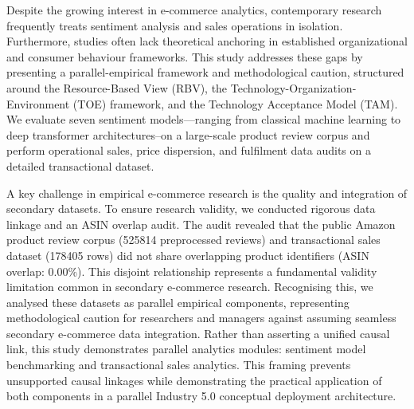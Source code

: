\documentclass[authoryear,review,3p,times,12pt]{elsarticle}
\begin{document}
Despite the growing interest in e-commerce analytics, contemporary research frequently treats sentiment analysis and sales operations in isolation. Furthermore, studies often lack theoretical anchoring in established organizational and consumer behaviour frameworks. This study addresses these gaps by presenting a parallel-empirical framework and methodological caution, structured around the Resource-Based View (RBV), the Technology-Organization-Environment (TOE) framework, and the Technology Acceptance Model (TAM). We evaluate seven sentiment models—ranging from classical machine learning to deep transformer architectures–on a large-scale product review corpus and perform operational sales, price dispersion, and fulfilment data audits on a detailed transactional dataset.

A key challenge in empirical e-commerce research is the quality and integration of secondary datasets. To ensure research validity, we conducted rigorous data linkage and an ASIN overlap audit. The audit revealed that the public Amazon product review corpus (525814 preprocessed reviews) and transactional sales dataset (178405 rows) did not share overlapping product identifiers (ASIN overlap: 0.00\%). This disjoint relationship represents a fundamental validity limitation common in secondary e-commerce research. Recognising this, we analysed these datasets as parallel empirical components, representing methodological caution for researchers and managers against assuming seamless secondary e-commerce data integration. Rather than asserting a unified causal link, this study demonstrates parallel analytics modules: sentiment model benchmarking and transactional sales analytics. This framing prevents unsupported causal linkages while demonstrating the practical application of both components in a parallel Industry 5.0 conceptual deployment architecture.
\end{document}
